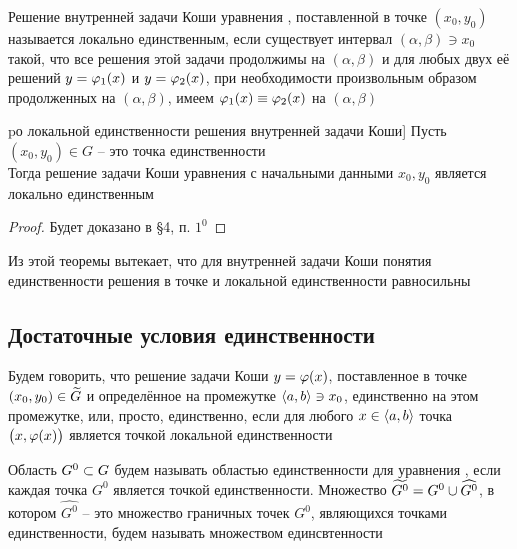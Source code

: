 \begin{definition}
    Решение внутренней задачи Коши уравнения , поставленной в точке $ (x_0, y_0) $ называется локально единственным, если существует интервал $ (\alpha, \beta) \ni x_0 $ такой, что все решения этой задачи продолжимы на $ (\alpha, \beta) $ и для любых двух её решений $ y = \varphi_1(x) $ и $ y = \varphi_2(x) $, при необходимости произвольным образом продолженных на $ (\alpha, \beta) $, имеем $ \varphi_1(x) \equiv \varphi_2(x) $ на $ (\alpha, \beta) $
\end{definition}

\begin{theorem}pо локальной единственности решения внутренней задачи Коши]
	Пусть $ (x_0, y_0) \in G $ -- это точка единственности \\
    Тогда решение задачи Коши уравнения  с начальными данными $ x_0, y_0 $ является локально единственным
\end{theorem}

\begin{proof}
	Будет доказано в \S4, п. $ 1^0 $
\end{proof}

\begin{implication}
	Из этой теоремы вытекает, что для внутренней задачи Коши понятия единственности решения в точке и локальной единственности равносильны
\end{implication}

\subsection{Достаточные условия единственности}

\begin{definition}
    Будем говорить, что решение задачи Коши $ y = \varphi(x) $, поставленное в точке $ (x_0, y_0) \in \widetilde{G} $ и определённое на промежутке $ \Braket{a, b} \ni x_0 $, единственно на этом промежутке, или, просто, единственно, если для любого $ x \in \Braket{a, b} $ точка $ \big( x, \varphi(x) \big) $ является точкой локальной единственности
\end{definition}

\begin{definition}
    Область $ G^0 \subset G $ будем называть областью единственности для уравнения , если каждая точка $ G^0 $ является точкой единственности. Множество $ \widetilde{G^0} = G^0 \cup \widehat{G^0} $, в котором $ \hat{G^0} $ -- это множество граничных точек $ G^0 $, являющихся точками единственности, будем называть множеством единсвтенности
\end{definition}

